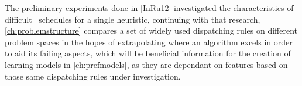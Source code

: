 The preliminary experiments done in \cref{InRu12} investigated the 
characteristics of difficult \jsp\ schedules for a single heuristic, continuing 
with that research, \cref{ch:problemstructure} compares a set of widely used 
dispatching rules on different problem spaces in the hopes of extrapolating 
where an algorithm excels in order to aid its failing aspects, which will be 
beneficial information for the creation of learning models in 
\cref{ch:prefmodels}, as they are dependant  on features based on those same 
dispatching rules under investigation.


\hfill\\\vspace{3cm}



